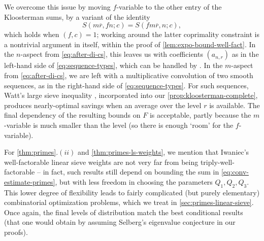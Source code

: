 \documentclass[reqno,11pt]{amsart}
\theoremstyle{remark}
\newtheorem*{remark}{Remark}
\numberwithin{equation}{section}
\renewcommand{\bar}{\overline}
\begin{document}
We overcome this issue by moving $f$-variable to the other entry of the Kloosterman sums, by a variant of the identity 
\[
    S(m \bar{r}, fn; c) = S(fm \bar{r}, n; c),
\]
which holds when $(f, c) = 1$; working around the latter coprimality constraint is a nontrivial argument in itself, within the proof of \cref{lem:expo-bound-well-fact}. In the $n$-aspect from \cref{eq:after-di-cs}, this leaves us with coefficients $(a_{n, r})$ as in the left-hand side of \cref{eq:sequence-types}, which can be handled by \cite[Theorem 3]{pascadi2024large}. In the $m$-aspect from \cref{eq:after-di-cs}, we are left with a multiplicative convolution of two smooth sequences, as in the right-hand side of \cref{eq:sequence-types}. For such sequences, Watt's large sieve inequality \cite[Theorem 2]{watt1995kloosterman}, incorporated into our \cref{prop:kloosterman-complete}, produces nearly-optimal savings when an average over the level $r$ is available. The final dependency of the resulting bounds on $F$ is acceptable, partly because the $m$-variable is much smaller than the level (so there is enough `room' for the $f$-variable). 


For \cref{thm:primes}.$(ii)$ and \cref{thm:primes-ls-weights}, we mention that Iwaniec's well-factorable linear sieve weights are not very far from being triply-well-factorable -- in fact, such results still depend on bounding the sum in \cref{eq:conv-estimate-primes}, but with less freedom in choosing the parameters $Q_1, Q_2, Q_3$. This lower degree of flexibility leads to fairly complicated (but purely elementary) combinatorial optimization problems, which we treat in \cref{sec:primes-linear-sieve}. Once again, the final levels of distribution match the best conditional results (that one would obtain by assuming Selberg's eigenvalue conjecture in our proofs).
\end{document}

